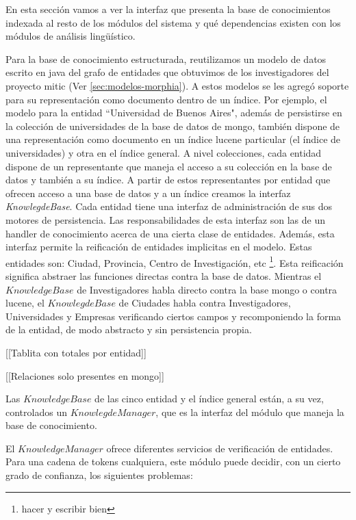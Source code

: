 En esta sección vamos a ver la interfaz que presenta la base de conocimientos indexada 
al resto de los módulos del sistema y qué dependencias existen con los módulos de
análisis lingüístico.

Para la base de conocimiento estructurada, reutilizamos un modelo de datos
escrito en java  del grafo de entidades que obtuvimos de los investigadores del proyecto mitic (Ver \ref{sec:modelos-morphia}).
A estos modelos se les agregó soporte para su representación como documento dentro de un índice.
Por ejemplo, el modelo para la entidad ``Universidad de Buenos Aires", además de
persistirse en la colección de universidades de la base de datos de mongo, también dispone de una representación como documento en 
un índice lucene particular (el índice de universidades) y otra en el índice general.
A nivel colecciones, cada entidad dispone de un representante que maneja el acceso a su colección en la base de datos y también a su índice. A partir de estos representantes por entidad que ofrecen acceso a una base de datos y a un índice creamos la interfaz \emph{KnowlegdeBase}. 
Cada entidad tiene una interfaz de administración de sus dos motores de persistencia. Las responsabilidades de esta interfaz son las de un handler de conocimiento acerca de una cierta clase de entidades. 
Además, esta interfaz permite la reificación de entidades implicitas en el modelo. Estas entidades son: Ciudad, Provincia, Centro de Investigación, etc \footnote{hacer y escribir bien}. Esta reificación significa abstraer las funciones directas contra la base de datos. Mientras el $KnowledgeBase$ de Investigadores habla directo contra la base mongo o contra lucene, el $KnowlegdeBase$ de Ciudades habla contra Investigadores, Universidades y Empresas verificando ciertos campos y recomponiendo la forma de la entidad, de modo abstracto y sin persistencia propia. 

[[Tablita con totales por entidad]]

\bigskip

[[Relaciones solo presentes en mongo]]

\bigskip

Las $KnowledgeBase$ de las cinco entidad y el índice general están, a su vez, controlados un $KnowlegdeManager$, que es la interfaz del módulo que maneja la base de conocimiento. 

El $KnowledgeManager$ ofrece diferentes servicios de verificación de entidades. Para una cadena de tokens cualquiera, este módulo puede decidir, con un cierto grado de confianza, los siguientes problemas:

